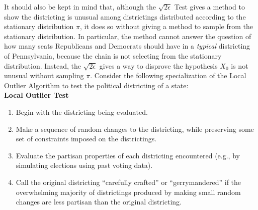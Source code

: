 \documentclass[12pt]{article}
\begin{document}
It should also be kept in mind that, although the \( \sqrt{2\epsilon} \)
Test gives a method to show the districting is unusual among
districtings distributed according to the stationary distribution \( \pi
\), it does so without giving a method to sample from the stationary
distribution.  In particular, the method cannot answer the question of
how many seats Republicans and Democrats should have in a \emph{typical}
districting of Pennsylvania, because the chain is not selecting from the
stationary distribution.  Instead, the \( \sqrt{2\epsilon} \) gives a way
to disprove the hypothesis \( X_{0} \) is not unusual without sampling \( \pi \).
Consider the following specialization of the Local Outlier Algorithm to
test the political districting of a state:\\
\textbf{Local Outlier Test}%
\begin{enumerate}
    \item
        Begin with the districting being evaluated.
    \item
        \label{enum:serialsignificance:mcstep} Make a sequence of random
        changes to the districting, while preserving some set of
        constraints imposed on the districtings.
    \item
        Evaluate the partisan properties of each districting encountered
        (e.g., by simulating elections using past voting data).
    \item
        \label{enum:serialsignificance:crafted} Call the original districting
        ``carefully crafted'' or ``gerrymandered'' if the overwhelming
        majority of districtings produced by making small random changes
        are less partisan than the original districting.
\end{enumerate}
\end{document}
